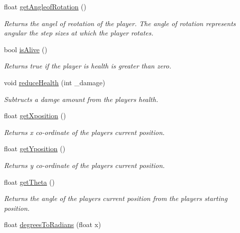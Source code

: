 \begin{DoxyCompactItemize}
\mbox{\label{class_player_logic_a692b3e5b8f5b052e28dbb0fdb7dc634c}} 
float \hyperlink{class_player_logic_a692b3e5b8f5b052e28dbb0fdb7dc634c}{get\+Angleof\+Rotation} ()
\begin{DoxyCompactList}\small\item\em Returns the angel of reotation of the player. The angle of rotation represents angular the step sizes at which the player rotates. \end{DoxyCompactList}\item 
bool \hyperlink{class_player_logic_a765133271ba47a6fa9b2b45136f1fe73}{is\+Alive} ()
\begin{DoxyCompactList}\small\item\em Returns true if the player is health is greater than zero. \end{DoxyCompactList}\item 
void \hyperlink{class_player_logic_a43c4cfcdfd439ff3ef8015c2170f9381}{reduce\+Health} (int \+\_\+damage)
\begin{DoxyCompactList}\small\item\em Subtructs a damge amount from the players health. \end{DoxyCompactList}\item 
float \hyperlink{class_player_logic_a9f92defe2d43690329bd6e334fb61e01}{get\+Xposition} ()
\begin{DoxyCompactList}\small\item\em Returns x co-\/ordinate of the player\textquotesingle{}s current position. \end{DoxyCompactList}\item 
float \hyperlink{class_player_logic_a58d683bde5ee078f3b21897f2a5f4677}{get\+Yposition} ()
\begin{DoxyCompactList}\small\item\em Returns y co-\/ordinate of the player\textquotesingle{}s current position. \end{DoxyCompactList}\item 
float \hyperlink{class_player_logic_a7ea2f59ddde028b5451ddbe60453de1c}{get\+Theta} ()
\begin{DoxyCompactList}\small\item\em Returns the angle of the player\textquotesingle{}s current position from the players starting position. \end{DoxyCompactList}\item 
float \hyperlink{class_player_logic_a425e0b7a5a4495958a41383525f059eb}{degrees\+To\+Radians} (float x)

\end{DoxyCompactItemize}
